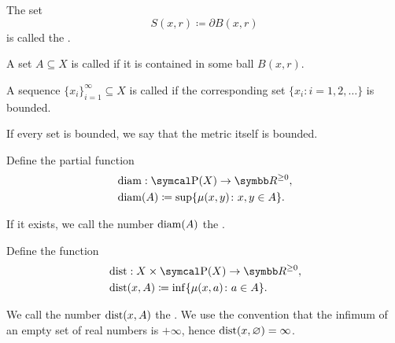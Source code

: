 \begin{definition}
\begin{defenum}
     The set
    \begin{equation*}
      S(x, r) \coloneqq \partial{B(x, r)}
    \end{equation*}
    is called the .

     A set \( A \subseteq X \) is called  if it is contained in some ball \( B(x, r) \).

     A sequence \( \{ x_i \}_{i=1}^\infty \subseteq X \) is called  if the corresponding set \( \{ x_i \colon i = 1, 2, \ldots \} \) is bounded.

     If every set is bounded, we say that the metric itself is bounded.

     Define the partial function
    \begin{align*}
      &\Diam: \Power(X) \to \R^{\geq 0}, \\
      &\Diam(A) \coloneqq \sup \{ \mu(x, y) \colon x, y \in A \}.
    \end{align*}

    If it exists, we call the number \( \operatorname{diam}(A) \) the .

     Define the function
    \begin{align*}
      &\Dist: X \times \Power(X) \to \R^{\geq 0}, \\
      &\Dist(x, A) \coloneqq \inf \{ \mu(x, a) \colon a \in A \}.
    \end{align*}

    We call the number \( \operatorname{dist}(x, A) \) the . We use the convention that the infimum of an empty set of real numbers is \( +\infty \), hence \( \operatorname{dist}(x, \varnothing) = \infty \).
  \end{defenum}
\end{definition}

